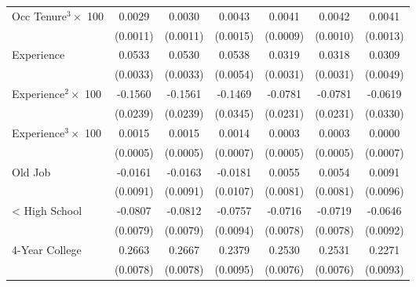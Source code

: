 {\begin{longtable}{l*{6}{c}}
Occ Tenure$^3\times$ 100&      0.0029\sym{***}&      0.0030\sym{***}&      0.0043\sym{***}&      0.0041\sym{***}&      0.0042\sym{***}&      0.0041\sym{***}\\
                    &    (0.0011)         &    (0.0011)         &    (0.0015)         &    (0.0009)         &    (0.0010)         &    (0.0013)         \\
Experience          &      0.0533\sym{***}&      0.0530\sym{***}&      0.0538\sym{***}&      0.0319\sym{***}&      0.0318\sym{***}&      0.0309\sym{***}\\
                    &    (0.0033)         &    (0.0033)         &    (0.0054)         &    (0.0031)         &    (0.0031)         &    (0.0049)         \\
Experience$^2\times$ 100&     -0.1560\sym{***}&     -0.1561\sym{***}&     -0.1469\sym{***}&     -0.0781\sym{***}&     -0.0781\sym{***}&     -0.0619\sym{*}  \\
                    &    (0.0239)         &    (0.0239)         &    (0.0345)         &    (0.0231)         &    (0.0231)         &    (0.0330)         \\
Experience$^3\times$ 100&      0.0015\sym{***}&      0.0015\sym{***}&      0.0014\sym{**} &      0.0003         &      0.0003         &      0.0000         \\
                    &    (0.0005)         &    (0.0005)         &    (0.0007)         &    (0.0005)         &    (0.0005)         &    (0.0007)         \\
Old Job             &     -0.0161\sym{*}  &     -0.0163\sym{*}  &     -0.0181\sym{*}  &      0.0055         &      0.0054         &      0.0091         \\
                    &    (0.0091)         &    (0.0091)         &    (0.0107)         &    (0.0081)         &    (0.0081)         &    (0.0096)         \\
< High School       &     -0.0807\sym{***}&     -0.0812\sym{***}&     -0.0757\sym{***}&     -0.0716\sym{***}&     -0.0719\sym{***}&     -0.0646\sym{***}\\
                    &    (0.0079)         &    (0.0079)         &    (0.0094)         &    (0.0078)         &    (0.0078)         &    (0.0092)         \\
4-Year College      &      0.2663\sym{***}&      0.2667\sym{***}&      0.2379\sym{***}&      0.2530\sym{***}&      0.2531\sym{***}&      0.2271\sym{***}\\
                    &    (0.0078)         &    (0.0078)         &    (0.0095)         &    (0.0076)         &    (0.0076)         &    (0.0093)         \\

\end{longtable}}
